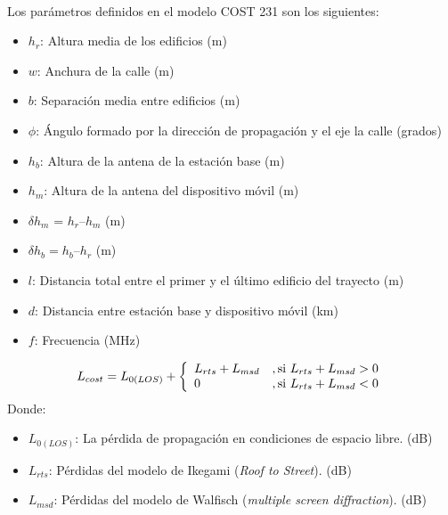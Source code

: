\documentclass[
	12pt, %
	fleqn, %
	a4paper, %
	oneside, %
]{LegrandOrangeBook}
\begin{document}
\begin{figure}[H]
\centering
{}\\
\end{figure}
Los parámetros definidos en el modelo COST 231 son los siguientes:
\begin{itemize}
\item $h_r$: Altura media de los edificios (m)
\item $w$: Anchura de la calle (m)
\item $b$: Separación media entre edificios (m)
\item $\phi$: Ángulo formado por la dirección de propagación y el eje la calle (grados)
\item $h_b$: Altura de la antena de la estación base (m)
\item $h_m$: Altura de la antena del dispositivo móvil (m)
\item $\delta h_m$ = $h_r – h_m$ (m)
\item $\delta h_b = h_b – h_r$ (m)
\item $l$: Distancia total entre el primer y el último edificio del trayecto (m)
\item $d$: Distancia entre estación base y dispositivo móvil (km)
\item $f$: Frecuencia (MHz)
\end{itemize}
\begin{equation}
L_{cost} =L_{0(LOS)}+ \left\lbrace
\begin{array}{ll}
L_{rts}+L_{msd}&, \textup{si }L_{rts}+L_{msd} > 0\\
0 & , \textup{si }L_{rts}+L_{msd} < 0
\end{array}
\right.
\end{equation}
Donde:
\begin{itemize}
\item $L_{0(LOS)}$: La pérdida de propagación en condiciones de espacio libre. (dB)
\item $L_{rts}$: Pérdidas del modelo de Ikegami (\textit{Roof to Street}). (dB)
\item $L_{msd}$: Pérdidas del modelo de Walfisch (\textit{multiple screen diffraction}). (dB)
\end{itemize}
\end{document}

